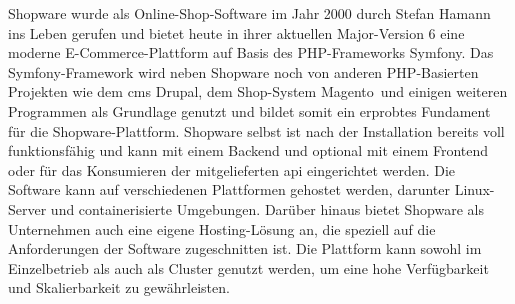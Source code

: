Shopware wurde als Online-Shop-Software im Jahr 2000 durch Stefan Hamann ins Leben gerufen
und bietet heute in ihrer aktuellen Major-Version 6 eine moderne E-Commerce-Plattform auf Basis des PHP-Frameworks
\glqq Symfony\grqq.
Das Symfony-Framework wird neben Shopware noch von anderen PHP-Basierten Projekten wie dem \gls{cms} \glqq Drupal\grqq,
dem Shop-System \glqq Magento\grqq\ und einigen weiteren Programmen als Grundlage genutzt
und bildet somit ein erprobtes Fundament für die Shopware-Plattform.
Shopware selbst ist nach der Installation bereits voll funktionsfähig und kann mit einem Backend und optional
mit einem Frontend oder für das Konsumieren der mitgelieferten \gls{api} eingerichtet werden.
Die Software kann auf verschiedenen Plattformen gehostet werden, darunter Linux-Server und containerisierte Umgebungen.
Darüber hinaus bietet Shopware als Unternehmen auch eine eigene Hosting-Lösung an, die speziell auf die Anforderungen
der Software zugeschnitten ist.
Die Plattform kann sowohl im Einzelbetrieb als auch als Cluster genutzt werden, um eine hohe Verfügbarkeit und
Skalierbarkeit zu gewährleisten.

\clearpage
